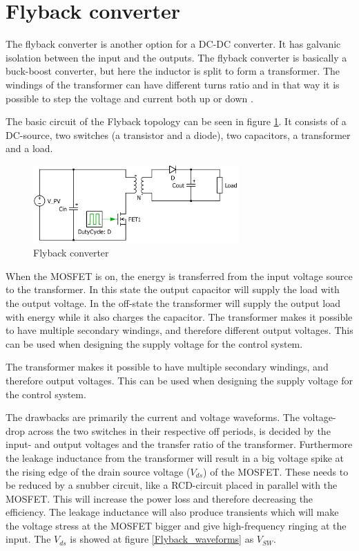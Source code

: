 \section{Flyback converter}

The flyback converter is another option for a DC-DC converter. It has galvanic isolation between the input and the outputs. The flyback converter is basically a buck-boost converter, but here the inductor is split to form a transformer. The windings of the transformer can have different turns ratio and in that way it is possible to step the voltage and current both up or down \cite{flyback}. 

The basic circuit of the Flyback topology can be seen in figure \ref{Flyback_SCHEMATIC}. It consists of a DC-source, two switches (a transistor and a diode), two capacitors, a transformer and a load.    

\begin{figure}[H]
	\begin{center}
	\includegraphics[width=0.7\textwidth]{../Pictures/flyback_schem.png}
	\caption{Flyback converter}
	\label{Flyback_SCHEMATIC}
	\end{center}
\end{figure}

When the MOSFET is on, the energy is transferred from the input voltage source to the transformer. In this state the output capacitor will supply the load with the output voltage. In the off-state the transformer will supply the output load with energy while it also charges the capacitor\cite{flyback}. 
The transformer makes it possible to have multiple secondary windings, and therefore different output voltages. This can be used when designing the supply voltage for the control system\cite{flyback}.

The transformer makes it possible to have multiple secondary windings, and therefore output voltages. This can be used when designing the supply voltage for the control system\cite{flyback}.  

The drawbacks are primarily the current and voltage waveforms. The voltage-drop across the two switches in their respective off periods, is decided by the input- and output voltages and the transfer ratio of the transformer. Furthermore the leakage inductance from the transformer will result in a big voltage spike at the rising edge of the drain source voltage ($V_{ds}$) of the MOSFET. These needs to be reduced by a snubber circuit, like a RCD-circuit placed in parallel with the MOSFET\cite{flyback}. This will increase the power loss and therefore decreasing the efficiency. The leakage inductance will also produce transients which will make the voltage stress at the MOSFET bigger and give high-frequency ringing at the input\cite{underthehood}. The $V_{ds}$ is showed at figure \ref{Flyback_waveforms} as $V_{SW}$.

